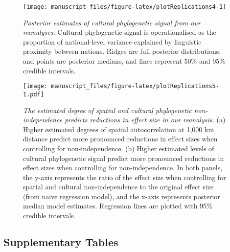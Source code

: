 \documentclass[
  man,floatsintext]{apa6}
\begin{document}
\newpage



\begin{figure}[H]
\texttt{[image: manuscript\_files/figure-latex/plotReplications4-1]} \caption{\emph{Posterior estimates of cultural phylogenetic signal from our reanalyses.} Cultural phylogenetic signal is operationalised as the proportion of national-level variance explained by linguistic proximity between nations. Ridges are full posterior distributions, and points are posterior medians, and lines represent 50\% and 95\% credible intervals.}\label{fig:plotReplications4}
\end{figure}

\newpage



\begin{figure}
\centering
\texttt{[image: manuscript\_files/figure-latex/plotReplications5-1.pdf]}
\caption{\label{fig:plotReplications5}\emph{The estimated degree of spatial and cultural phylogenetic non-independence predicts reductions in effect size in our reanalysis.} (a) Higher estimated degrees of spatial autocorrelation at 1,000 km distance predict more pronounced reductions in effect sizes when controlling for non-independence. (b) Higher estimated levels of cultural phylogenetic signal predict more pronounced reductions in effect sizes when controlling for non-independence. In both panels, the y-axis represents the ratio of the effect size when controlling for spatial and cultural non-independence to the original effect size (from naive regression model), and the x-axis represents posterior median model estimates. Regression lines are plotted with 95\% credible intervals.}
\end{figure}

\newpage

\hypertarget{supplementary-tables}{%
\subsection{Supplementary Tables}\label{supplementary-tables}}
\end{document}
